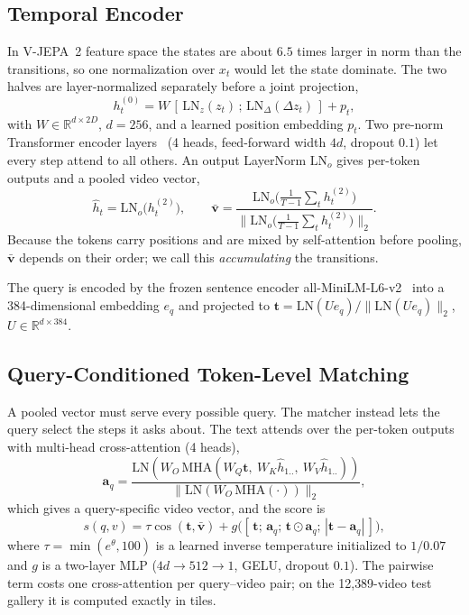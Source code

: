 \documentclass[lettersize,journal]{IEEEtran}
\begin{document}
\subsection{Temporal Encoder}
In V-JEPA~2 feature space the states are about $6.5$ times larger in norm than
the transitions, so one normalization over $x_t$ would let the state dominate.
The two halves are layer-normalized separately before a joint projection,
\begin{equation}
h_t^{(0)} = W\,[\,\mathrm{LN}_{z}(z_t)\,;\,\mathrm{LN}_{\Delta}(\Delta z_t)\,] + p_t,
\end{equation}
with $W\in\mathbb{R}^{d\times 2D}$, $d=256$, and a learned position embedding
$p_t$. Two pre-norm Transformer encoder layers~\cite{vaswani2017attention}
(4 heads, feed-forward width $4d$, dropout $0.1$) let every step attend to all
others. An output LayerNorm $\mathrm{LN}_o$ gives per-token outputs and a pooled
video vector,
\begin{equation}
\hat h_t = \mathrm{LN}_o\big(h_t^{(2)}\big),\qquad
\bar{\mathbf v} = \frac{\mathrm{LN}_o\big(\tfrac{1}{T-1}\sum_t h_t^{(2)}\big)}
                       {\big\|\mathrm{LN}_o\big(\tfrac{1}{T-1}\sum_t h_t^{(2)}\big)\big\|_2}.
\end{equation}
Because the tokens carry positions and are mixed by self-attention before
pooling, $\bar{\mathbf v}$ depends on their order; we call this
\emph{accumulating} the transitions.

The query is encoded by the frozen sentence encoder
all-MiniLM-L6-v2~\cite{wang2020minilm,reimers2019sbert} into a 384-dimensional
embedding $e_q$ and projected to
$\mathbf t = \mathrm{LN}(U e_q)/\|\mathrm{LN}(U e_q)\|_2$, $U\in\mathbb R^{d\times 384}$.

\subsection{Query-Conditioned Token-Level Matching}
\label{sec:matching}
A pooled vector must serve every possible query. The matcher instead lets the
query select the steps it asks about. The text attends over the per-token
outputs with multi-head cross-attention (4 heads),
\begin{equation}
\mathbf a_q = \frac{\mathrm{LN}(W_O\,\mathrm{MHA}(W_Q\mathbf t,\ W_K\hat h_{1..},\ W_V\hat h_{1..}))}
                   {\|\mathrm{LN}(W_O\,\mathrm{MHA}(\cdot))\|_2},
\end{equation}
which gives a query-specific video vector, and the score is
\begin{equation}
\label{eq:score}
s(q,v) = \tau\cos(\mathbf t,\bar{\mathbf v})
  + g\big([\,\mathbf t;\,\mathbf a_q;\,\mathbf t\odot\mathbf a_q;\,|\mathbf t-\mathbf a_q|\,]\big),
\end{equation}
where $\tau=\min(e^\theta,100)$ is a learned inverse temperature initialized to
$1/0.07$ and $g$ is a two-layer MLP ($4d\to512\to1$, GELU, dropout $0.1$). The
pairwise term costs one cross-attention per query--video pair; on the
12{,}389-video test gallery it is computed exactly in tiles.
\end{document}
